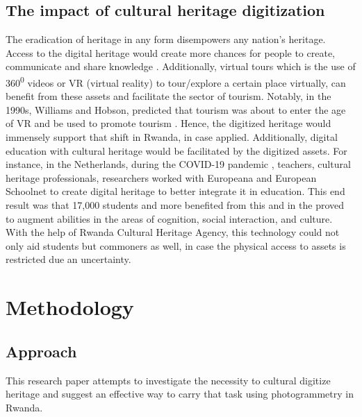 \documentclass[conference]{IEEEtran}
\begin{document}
\subsection{\textbf{The impact of cultural heritage digitization}}
The eradication of heritage in any form disempowers any nation's heritage. Access to the digital heritage would create more chances for people to create, communicate and share knowledge \cite{charter002}. Additionally, virtual tours
which is the use of 360\textsuperscript{0} videos or VR (virtual reality) to tour/explore a certain place virtually, can benefit from these assets and facilitate the sector of tourism. Notably, in the 1990s, Williams and Hobson, predicted
that tourism was about to enter the age of VR and be used to promote tourism \cite{Yang2021}. Hence, the digitized heritage would immensely support that shift in Rwanda, in case applied. Additionally, digital education with cultural heritage
would be facilitated by the digitized assets. For instance, in the Netherlands, during the COVID-19 pandemic \cite{eddig}, teachers, cultural heritage professionals, researchers worked with Europeana and European Schoolnet to create
digital heritage to better integrate it in education. This end result was that 17,000 students and more benefited from this and in the proved to augment abilities in the areas of cognition, social interaction, and culture.  With the help of
Rwanda Cultural Heritage Agency, this technology could not only aid students but commoners as well, in case the physical access to assets is restricted due an uncertainty. \\

\section{\textbf{Methodology}}
\subsection{Approach}
This research paper attempts to investigate the necessity to cultural digitize heritage and suggest an effective way to carry that task using photogrammetry in Rwanda. 
\end{document}
